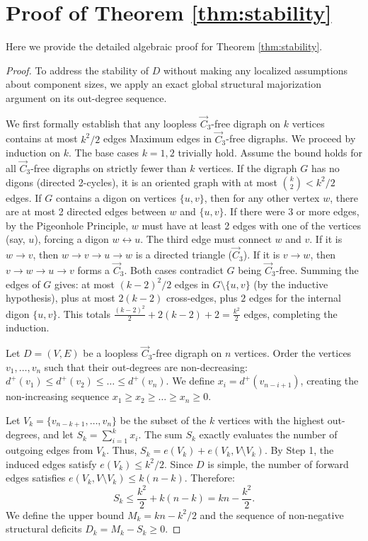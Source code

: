 \documentclass[a4paper]{amsart}
\begin{document}
\section{Proof of Theorem \ref{thm:stability}}

Here we provide the detailed algebraic proof for Theorem \ref{thm:stability}.

\begin{proof}
To address the stability of $D$ without making any localized assumptions about component sizes,
we apply an exact global structural majorization argument on its out-degree sequence.

We first formally establish that any loopless $\vec{C}_3$-free digraph on $k$ vertices contains at most $k^2/2$ edges Maximum edges in $\vec{C}_3$-free digraphs.
We proceed by induction on $k$.
The base cases $k=1, 2$ trivially hold.
Assume the bound holds for all $\vec{C}_3$-free digraphs on strictly fewer than $k$ vertices.
If the digraph $G$ has no digons (directed 2-cycles),
it is an oriented graph with at most $\binom{k}{2} < k^2/2$ edges.
If $G$ contains a digon on vertices $\{u, v\}$,
then for any other vertex $w$,
there are at most 2 directed edges between $w$ and $\{u,v\}$.
If there were 3 or more edges,
by the Pigeonhole Principle,
$w$ must have at least 2 edges with one of the vertices (say, $u$),
forcing a digon $w \leftrightarrow u$.
The third edge must connect $w$ and $v$.
If it is $w \to v$,
then $w \to v \to u \to w$ is a directed triangle ($\vec{C}_3$).
If it is $v \to w$,
then $v \to w \to u \to v$ forms a $\vec{C}_3$.
Both cases contradict $G$ being $\vec{C}_3$-free.
Summing the edges of $G$ gives:
at most $(k-2)^2/2$ edges in $G \setminus \{u,v\}$ (by the inductive hypothesis),
plus at most $2(k-2)$ cross-edges,
plus $2$ edges for the internal digon $\{u,v\}$.
This totals $\frac{(k-2)^2}{2} + 2(k-2) + 2 = \frac{k^2}{2}$ edges,
completing the induction.

Let $D = (V,E)$ be a loopless $\vec{C}_3$-free digraph on $n$ vertices.
Order the vertices $v_1, \dots, v_n$ such that their out-degrees are non-decreasing:
$d^+(v_1) \le d^+(v_2) \le \dots \le d^+(v_n)$.
We define $x_i = d^+(v_{n-i+1})$,
creating the non-increasing sequence $x_1 \ge x_2 \ge \dots \ge x_n \ge 0$.

Let $V_k = \{v_{n-k+1}, \dots, v_n\}$ be the subset of the $k$ vertices with the highest out-degrees,
and let $S_k = \sum_{i=1}^k x_i$.
The sum $S_k$ exactly evaluates the number of outgoing edges from $V_k$.
Thus, $S_k = e(V_k) + e(V_k, V \setminus V_k)$.
By Step 1, the induced edges satisfy $e(V_k) \le k^2/2$.
Since $D$ is simple, the number of forward edges satisfies $e(V_k, V \setminus V_k) \le k(n-k)$.
Therefore:
\begin{equation}
S_k \le \frac{k^2}{2} + k(n-k) = kn - \frac{k^2}{2}.
\end{equation}
We define the upper bound $M_k = kn - k^2/2$ and the sequence of non-negative structural deficits $D_k = M_k - S_k \ge 0$.


\end{proof}
\end{document}
